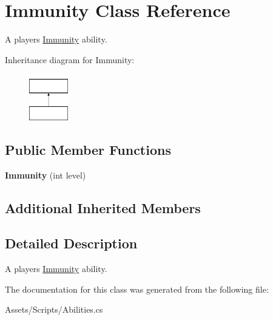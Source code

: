 \hypertarget{class_immunity}{}\section{Immunity Class Reference}
\label{class_immunity}


A player\textquotesingle{}s \hyperlink{class_immunity}{Immunity} ability.  


Inheritance diagram for Immunity\+:\begin{figure}[H]
\begin{center}
\leavevmode
\includegraphics[height=2.000000cm]{class_immunity}
\end{center}
\end{figure}
\subsection*{Public Member Functions}
\begin{DoxyCompactItemize}
\item 
{\bfseries Immunity} (int level)\hypertarget{class_immunity_adb47a636740a4f4624d3ee930bbff558}{}\label{class_immunity_adb47a636740a4f4624d3ee930bbff558}

\end{DoxyCompactItemize}
\subsection*{Additional Inherited Members}


\subsection{Detailed Description}
A player\textquotesingle{}s \hyperlink{class_immunity}{Immunity} ability. 



The documentation for this class was generated from the following file\+:\begin{DoxyCompactItemize}
\item 
Assets/\+Scripts/Abilities.\+cs\end{DoxyCompactItemize}
